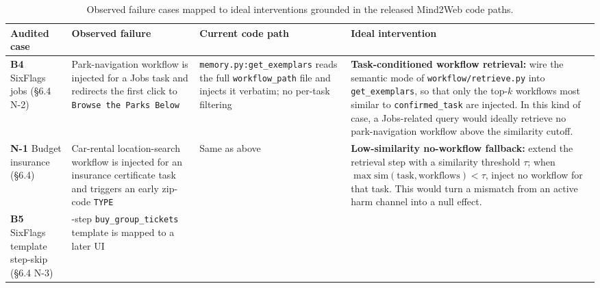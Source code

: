 \documentclass{article}
\begin{document}
{\begin{longtable}[]{@{}
  >{\raggedright\arraybackslash}p{}
  >{\raggedright\arraybackslash}p{}
  >{\raggedright\arraybackslash}p{}
  >{\raggedright\arraybackslash}p{}@{}}
\caption{Observed failure cases mapped to ideal interventions grounded
in the released Mind2Web code paths.}\label{tab:ideal-interventions}\\

\toprule\noalign{}
\begin{minipage}[b]{\linewidth}\raggedright
Audited case
\end{minipage} & \begin{minipage}[b]{\linewidth}\raggedright
Observed failure
\end{minipage} & \begin{minipage}[b]{\linewidth}\raggedright
Current code path
\end{minipage} & \begin{minipage}[b]{\linewidth}\raggedright
Ideal intervention
\end{minipage} \\
\midrule\noalign{}
\endhead
\bottomrule\noalign{}
\endlastfoot
\textbf{B4} SixFlags jobs (§6.4 N-2) &
Park-navigation workflow is injected for a Jobs task and redirects the
first click to \texttt{Browse the Parks Below} &
\texttt{memory.py:get\_exemplars} reads the full \texttt{workflow\_path}
file and injects it verbatim; no per-task filtering &
\textbf{Task-conditioned workflow retrieval:} wire the semantic mode
of \texttt{workflow/retrieve.py} into \texttt{get\_exemplars}, so that
only the top-\(k\) workflows most similar to \texttt{confirmed\_task}
are injected. In this kind of case, a Jobs-related query would ideally
retrieve no park-navigation workflow above the similarity cutoff. \\
\textbf{N-1} Budget insurance (§6.4) &
Car-rental location-search workflow is injected for an insurance
certificate task and triggers an early zip-code \texttt{TYPE} &
Same as above &
\textbf{Low-similarity no-workflow fallback:} extend the retrieval
step with a similarity threshold \(\tau\); when
\(\max\mathrm{sim}(\text{task}, \text{workflows}) < \tau\), inject no
workflow for that task. This would turn a mismatch from an active harm
channel into a null effect. \\
\textbf{B5} SixFlags template step-skip (§6.4 N-3) &
2-step \texttt{buy\_group\_tickets} template is mapped to a later UI

\end{longtable}}
\end{document}
